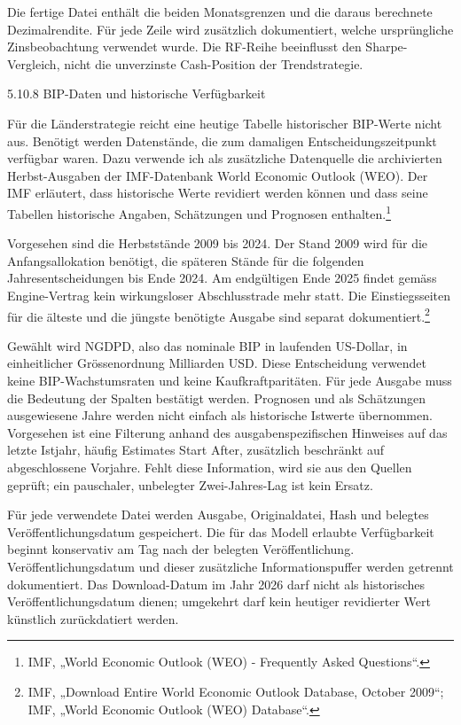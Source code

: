 \documentclass[
  ngerman,
  a4paper,
  DIV=11,
  oneside]{scrreprt}
\begin{document}
Die fertige Datei enthält die beiden Monatsgrenzen und die daraus
berechnete Dezimalrendite. Für jede Zeile wird zusätzlich dokumentiert,
welche ursprüngliche Zinsbeobachtung verwendet wurde. Die RF-Reihe
beeinflusst den Sharpe-Vergleich, nicht die unverzinste Cash-Position
der Trendstrategie.

5.10.8 BIP-Daten und historische Verfügbarkeit

Für die Länderstrategie reicht eine heutige Tabelle historischer
BIP-Werte nicht aus. Benötigt werden Datenstände, die zum damaligen
Entscheidungszeitpunkt verfügbar waren. Dazu verwende ich als
zusätzliche Datenquelle die archivierten Herbst-Ausgaben der
IMF-Datenbank World Economic Outlook (WEO). Der IMF erläutert, dass
historische Werte revidiert werden können und dass seine Tabellen
historische Angaben, Schätzungen und Prognosen enthalten.\footnote{IMF,
  {„World {Economic Outlook} ({WEO}) - {Frequently Asked Questions}``}.}

Vorgesehen sind die Herbststände 2009 bis 2024. Der Stand 2009 wird für
die Anfangsallokation benötigt, die späteren Stände für die folgenden
Jahresentscheidungen bis Ende 2024. Am endgültigen Ende 2025 findet
gemäss Engine-Vertrag kein wirkungsloser Abschlusstrade mehr statt. Die
Einstiegsseiten für die älteste und die jüngste benötigte Ausgabe sind
separat dokumentiert.\footnote{IMF, {„Download Entire {World Economic
  Outlook} Database, {October} 2009``}; IMF, {„World {Economic Outlook}
  ({WEO}) {Database}``}.}

Gewählt wird NGDPD, also das nominale BIP in laufenden US-Dollar, in
einheitlicher Grössenordnung Milliarden USD. Diese Entscheidung
verwendet keine BIP-Wachstumsraten und keine Kaufkraftparitäten. Für
jede Ausgabe muss die Bedeutung der Spalten bestätigt werden. Prognosen
und als Schätzungen ausgewiesene Jahre werden nicht einfach als
historische Istwerte übernommen. Vorgesehen ist eine Filterung anhand
des ausgabenspezifischen Hinweises auf das letzte Istjahr, häufig
Estimates Start After, zusätzlich beschränkt auf abgeschlossene
Vorjahre. Fehlt diese Information, wird sie aus den Quellen geprüft; ein
pauschaler, unbelegter Zwei-Jahres-Lag ist kein Ersatz.

Für jede verwendete Datei werden Ausgabe, Originaldatei, Hash und
belegtes Veröffentlichungsdatum gespeichert. Die für das Modell erlaubte
Verfügbarkeit beginnt konservativ am Tag nach der belegten
Veröffentlichung. Veröffentlichungsdatum und dieser zusätzliche
Informationspuffer werden getrennt dokumentiert. Das Download-Datum im
Jahr 2026 darf nicht als historisches Veröffentlichungsdatum dienen;
umgekehrt darf kein heutiger revidierter Wert künstlich zurückdatiert
werden.
\end{document}
